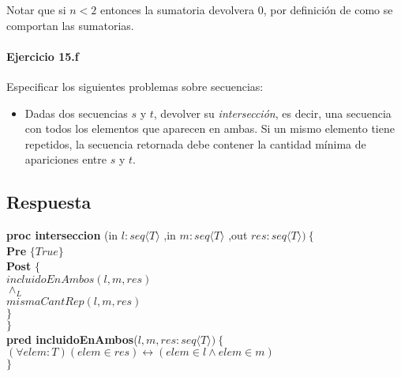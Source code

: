 \documentclass[a4paper]{article}
\begin{document}
Notar que si $n<2$ entonces la sumatoria devolvera 0, por definición de como se comportan las 
sumatorias.
			
\paragraph*{Ejercicio 15.f} Especificar los siguientes problemas sobre secuencias:
	\begin{itemize}
		\item Dadas dos secuencias $s$ y $t$, devolver su \textit{intersección}, es
				decir, una secuencia con todos los elementos que aparecen en ambas. Si un mismo
				elemento tiene repetidos, la secuencia retornada debe contener la cantidad
				mínima de apariciones entre $s$ y $t$.
	\end{itemize}

\subsection*{Respuesta}

			\textbf{proc interseccion }(in $l:seq\langle T\rangle$
				,in $m:seq\langle T\rangle$
				,out $res:seq\langle T\rangle )\ \{$\smallskip \\
			\hspace*{6mm} \textbf{Pre }$\{ True\}$\smallskip \\
			\hspace*{6mm} \textbf{Post }$\{$\\
			\hspace*{6mm} $incluidoEnAmbos(l,m,res)$\\
			\hspace*{6mm} $\wedge_L$\\
			\hspace*{6mm} $mismaCantRep(l,m,res)$\\
			\hspace*{6mm} $\}$\\
			\hspace*{5mm}$\}$\smallskip \\
			
			\textbf{pred incluidoEnAmbos}($l,m,res:seq\langle T\rangle)
			\ \{$\smallskip \\
			\hspace*{6mm}$ (\forall elem:T)(elem\in res) \leftrightarrow (elem\in l \wedge 
			elem\in m)$\\
			\hspace*{5mm}$\}$\smallskip \\	
			
\end{document}
